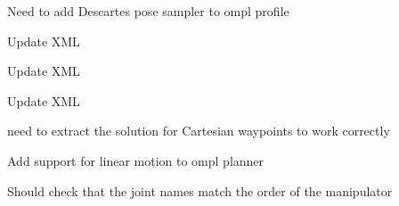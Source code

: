\begin{DoxyRefList}
\label{todo__todo000025}%
%
Need to add Descartes pose sampler to ompl profile  
\item[Member \mbox{\hyperlink{classtesseract__planning_1_1OMPLDefaultPlanProfile_a46c010d4fcdb918631ac92016d3bfccd}{tesseract\+\_\+planning\+::OMPLDefault\+Plan\+Profile\+::OMPLDefault\+Plan\+Profile}} (const tinyxml2\+::\+XMLElement \&xml\+\_\+element)]\label{todo__todo000022}%
%
Update XML 

\label{todo__todo000023}%
%
Update XML  
\item[Member \mbox{\hyperlink{classtesseract__planning_1_1OMPLDefaultPlanProfile_a9ceeaf8d8a01e483992a71b15cb32df4}{tesseract\+\_\+planning\+::OMPLDefault\+Plan\+Profile\+::to\+XML}} (tinyxml2\+::\+XMLDocument \&doc) const override]\label{todo__todo000027}%
%
Update XML  
\item[Member \mbox{\hyperlink{classtesseract__planning_1_1OMPLMotionPlanner_a26896a1ffb6a331553b3e7dec2af8684}{tesseract\+\_\+planning\+::OMPLMotion\+Planner\+::create\+Problems}} (const \mbox{\hyperlink{structtesseract__planning_1_1PlannerRequest}{Planner\+Request}} \&request) const]\label{todo__todo000021}%
%
need to extract the solution for Cartesian waypoints to work correctly 

\label{todo__todo000019}%
%
Add support for linear motion to ompl planner 

\label{todo__todo000018}%
%
Should check that the joint names match the order of the manipulator 


\end{DoxyRefList}

